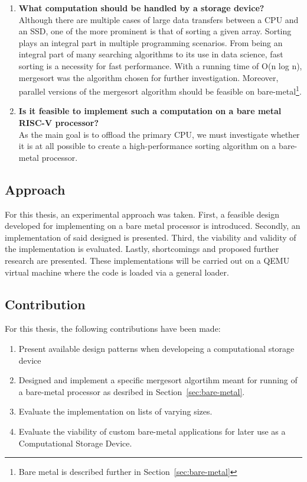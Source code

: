 \begin{enumerate}
  \item {\large \textbf{What computation should be handled by a storage
    device?}}\label{sec:computational} \\
    Although there are multiple cases of large data transfers between a CPU and
    an SSD, one of the more prominent is that of sorting a given array. Sorting
    plays an integral part in multiple programming scenarios. From being an
    integral part of many searching algorithms to its use in data science, fast
    sorting is a necessity for fast performance. With a running time of O(n log
    n), mergesort was the algorithm chosen for further investigation. Moreover,
    parallel versions of the mergesort algorithm should be feasible on
    bare-metal\footnote{Bare metal is described further in
    Section~\ref{sec:bare-metal}}.
  \item {\large \textbf{ Is it feasible to implement such a computation on a
    bare metal RISC-V processor?}} \\
    As the main goal is to offload the primary CPU, we must investigate whether
    it is at all possible to create a high-performance sorting algorithm on a
    bare-metal processor.
\end{enumerate}


\subsection{Approach}\label{sec:approach}
For this thesis, an experimental approach was taken. First, a feasible design
developed for implementing on a bare metal processor is introduced. Secondly, an
implementation of said designed is presented. Third, the viability and validity
of the implementation is evaluated. Lastly, shortcomings and proposed further
research are presented. These implementations will be carried out on a QEMU
virtual machine where the code is loaded via a general loader.

\subsection{Contribution}
For this thesis, the following contributions have been made:
\begin{enumerate}
  \item Present available design patterns when developeing a computational
    storage device
  \item Designed and implement a specific mergesort algortihm meant for running of a
    bare-metal processor as desribed in Section~\ref{sec:bare-metal}.
  \item Evaluate the implementation on lists of varying sizes.
  \item Evaluate the viability of custom bare-metal applications for later use
    as a Computational Storage Device.
\end{enumerate}


